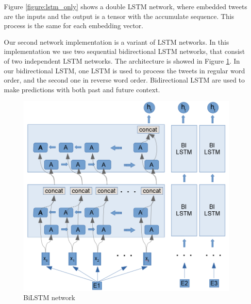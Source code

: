 \documentclass[12pt]{report}
\begin{document}
Figure \ref{figure:lstm_only} shows a double \ac{LSTM} network, where embedded tweets are the inputs and the output is a tensor with the accumulate sequence. This process is the same for each embedding vector.

Our second network implementation is a variant of \ac{LSTM} networks. In this implementation we use two sequential bidirectional LSTM networks, that consist of
 two independent \ac{LSTM} networks. The architecture is showed in Figure \ref{figure:bilstm}. In our bidirectional LSTM,  one LSTM is used to process the tweets in regular word order,  and the second one in reverse word order. Bidirectional LSTM are used to make predictions with both past and future context. 
 



\begin{figure}[H]	
	\centering
	\includegraphics[width=150mm, scale = 1]{images/13_bilstm.png}	
	\caption{BiLSTM network}	
	\label{figure:bilstm}
\end{figure}
\end{document}
